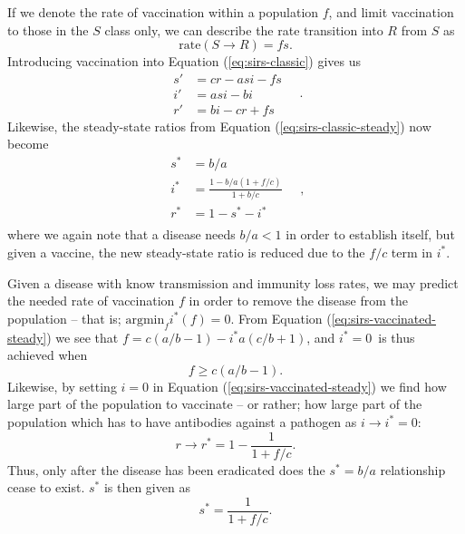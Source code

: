 \documentclass[]{article}
\begin{document}
If we denote the rate of vaccination within a population $f$, and limit vaccination to those in the $S$ class only, we can describe the rate transition into $R$ from $S$ as
\begin{equation}
	\mathrm{rate}(S \rightarrow R) = fs.
\end{equation}
Introducing vaccination into Equation (\ref{eq:sirs-classic}) gives us
\begin{equation} \label{eq:sirs-vaccinated}
\begin{aligned}
	s' &= cr - asi - fs \\
	i' &= asi - bi \\
	r' &= bi - cr + fs
\end{aligned} \quad .
\end{equation}
Likewise, the steady-state ratios from Equation (\ref{eq:sirs-classic-steady}) now become
\begin{equation} \label{eq:sirs-vaccinated-steady}
\begin{aligned}
	s^* &= b/a \\
	i^* &= \frac{1 - b/a(1 + f/c)}{1 + b/c} \\
	r^* &= 1 - s^* - i^* \\
\end{aligned} \quad ,
\end{equation}
where we again note that a disease needs $b/a < 1$ in order to establish itself, but given a vaccine, the new steady-state ratio is reduced due to the $f/c$ term in $i^*$.

Given a disease with know transmission and immunity loss rates, we may predict the needed rate of vaccination $f$ in order to remove the disease from the population -- that is; $\mathrm{argmin}_{f} i^*(f) = 0$. From Equation (\ref{eq:sirs-vaccinated-steady}) we see that $f = c(a/b - 1) - i^*a(c/b + 1)$, and $i^* = 0$ is thus achieved when
\begin{equation} \label{eq:vaccination-rate-min}
	f \ge c(a/b - 1).
\end{equation}
Likewise, by setting $i = 0$ in Equation (\ref{eq:sirs-vaccinated-steady}) we find how large part of the population to vaccinate -- or rather; how large part of the population which has to have antibodies against a pathogen as $i \rightarrow i^* = 0$:
\begin{equation} \label{eq:vaccination-fraction}
	r \rightarrow r^* = 1 - \frac{1}{1 + f/c}.
\end{equation}
Thus, only after the disease has been eradicated does the $s^* = b/a$ relationship cease to exist. $s^*$ is then given as
\begin{equation}
	s^* = \frac{1}{1 + f/c}.
\end{equation}
\end{document}
